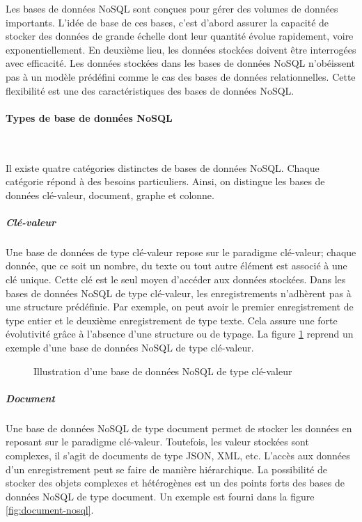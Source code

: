 	
	Les bases de données NoSQL sont conçues pour gérer des  volumes de données importants. L'idée de base de ces bases, c'est d'abord assurer la capacité de stocker des données de grande échelle dont leur  quantité  évolue rapidement, voire exponentiellement.  En deuxième lieu, les données stockées  doivent être interrogées  avec efficacité. Les données stockées dans  les bases de données NoSQL n'obéissent pas à un modèle prédéfini comme le cas des bases de données relationnelles. Cette flexibilité est une des caractéristiques des bases de données NoSQL.
	
	
	\paragraph{Types de base de données NoSQL} \label{sec:nosql-database}  ~
	
	Il existe quatre catégories distinctes de bases de données NoSQL. Chaque catégorie répond  à des besoins particuliers. Ainsi, on distingue les bases de données clé-valeur, document, graphe et colonne.
	
	


	\subparagraph {Clé-valeur} Une base de données de type clé-valeur repose sur le paradigme clé-valeur; chaque donnée, que ce soit un nombre, du texte ou tout autre élément est associé à une clé unique. Cette clé est le seul moyen d'accéder aux données stockées.
	Dans les bases de données NoSQL de type clé-valeur, les enregistrements  n'adhèrent pas à une structure prédéfinie. Par exemple, on peut avoir le premier enregistrement de type entier et le deuxième enregistrement de type texte. Cela assure une forte évolutivité grâce à l'absence d'une structure ou de typage. La figure \ref{fig:key-value-nosql} reprend un exemple d'une base de données NoSQL de type clé-valeur.

	
	\begin{figure}[H]
		\captionsetup{justification=centering}
		\centering
		\resizebox{!}{!}{
			
	    }
		\caption{Illustration d'une base de données NoSQL de type clé-valeur}
		\label{fig:key-value-nosql}
	\end{figure}
	

		\subparagraph{Document} Une base de données NoSQL de type document permet de stocker les données en reposant sur le paradigme clé-valeur. Toutefois, les valeur stockées sont complexes, il s'agit de documents de type JSON, XML, etc. L'accès aux données d'un enregistrement peut se faire de manière hiérarchique. La possibilité de stocker des objets complexes et hétérogènes  est un des points forts des bases de données NoSQL de type  document. Un exemple est fourni dans la figure \ref{fig:document-nosql}.
		
